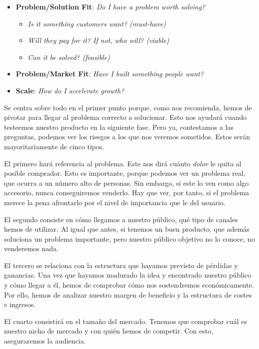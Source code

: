 \begin{itemize}
    \item \textbf{Problem/Solution Fit}: \textit{Do I have a problem worth solving?}
    \begin{itemize}
        \item \textit{Is it something customers want? (must-have)}
        \item \textit{Will they pay for it? If not, who will? (viable)}
        \item \textit{Can it be solved? (feasible)}
    \end{itemize}
    \item \textbf{Problem/Market Fit}: \textit{Have I built something people want?}
    \item \textbf{Scale}: \textit{How do I accelerate growth?}
\end{itemize}

Se centra sobre todo en el primer punto porque, como nos recomienda, hemos de pivotar para llegar al problema correcto a solucionar. Esto nos ayudará cuando testeemos nuestro producto en la siguiente fase. Pero ya, contestamos a las preguntas, podemos ver los riesgos a los que nos veremos sometidos. Estos serán mayoritariamente de cinco tipos.

El primero hará referencia al problema. Este nos dirá cuánto \textit{dolor} le quita al posible comprador. Esto es importante, porque podemos ver un problema real, que ocurra a un número alto de personas. Sin embargo, si este lo ven como algo accesorio, nunca conseguiremos venderlo. Hay que ver, por tanto, si el problema merece la pena afrontarlo por el nivel de importancia que le del usuario.

El segundo consiste en cómo llegamos a nuestro público, qué tipo de canales hemos de utilizar. Al igual que antes, si tenemos un buen producto, que además soluciona un problema importante, pero nuestro público objetivo no lo conoce, no venderemos nada.

El tercero se relaciona con la estructura que hayamos previsto de pérdidas y ganancias. Una vez que hayamos madurado la idea y encontrado nuestro público y cómo llegar a él, hemos de comprobar cómo nos sostendremos económicamente. Por ello, hemos de analizar nuestro margen de beneficio y la estructura de costes e ingresos.

El cuarto consistirá en el tamaño del mercado. Tenemos que comprobar cuál es nuestro nicho de mercado y con quién hemos de competir. Con esto, aseguraremos la audiencia.

